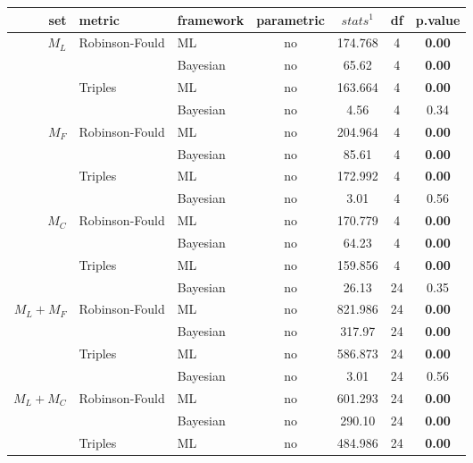 \begin{tabular}{rllcccc}
    \hline
    set & metric & framework & parametric & $stats^1$ & df & p.value \\
    \hline
    $M_L$         & Robinson-Fould & ML       & no & 174.768  & 4   & \textbf{0.00} \\
                  &                & Bayesian & no & 65.62    & 4   & \textbf{0.00} \\ 
                  & Triples        & ML       & no & 163.664  & 4   & \textbf{0.00} \\
                  &                & Bayesian & no & 4.56     & 4   & 0.34          \\ 
    $M_F$         & Robinson-Fould & ML       & no & 204.964  & 4   & \textbf{0.00} \\
                  &                & Bayesian & no & 85.61    & 4   & \textbf{0.00} \\
                  & Triples        & ML       & no & 172.992  & 4   & \textbf{0.00} \\
                  &                & Bayesian & no & 3.01     & 4   & 0.56          \\
    $M_C$         & Robinson-Fould & ML       & no & 170.779  & 4   & \textbf{0.00} \\ 
                  &                & Bayesian & no & 64.23    & 4   & \textbf{0.00} \\
                  & Triples        & ML       & no & 159.856  & 4   & \textbf{0.00} \\
                  &                & Bayesian & no & 26.13    & 24  & 0.35          \\
    $M_L+M_F$     & Robinson-Fould & ML       & no & 821.986  & 24  & \textbf{0.00} \\
                  &                & Bayesian & no & 317.97   & 24  & \textbf{0.00} \\
                  & Triples        & ML       & no & 586.873  & 24  & \textbf{0.00} \\
                  &                & Bayesian & no & 3.01     & 24  & 0.56          \\
    $M_L+M_C$     & Robinson-Fould & ML       & no & 601.293  & 24  & \textbf{0.00} \\
                  &                & Bayesian & no & 290.10   & 24  & \textbf{0.00} \\
                  & Triples        & ML       & no & 484.986  & 24  & \textbf{0.00} \\

\end{tabular}
